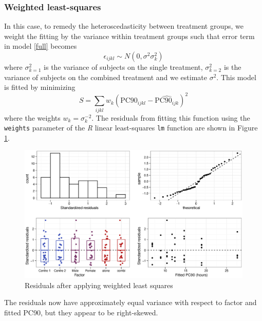 \subsubsection*{Weighted least-squares}
In this case, to remedy the heteroscedasticity between treatment groups, we weight the fitting by the variance within treatment groups such that error term in model \ref{full} becomes 
\begin{equation}
\epsilon_{ijkl}\sim N(0,\sigma^2\sigma_{k}^{2})\label{wls}
\end{equation}
where $\sigma_{k=1}^{2}$ is the variance of subjects on the single treatment, $\sigma_{k=2}^{2}$ is the variance of subjects on the combined treatment and we estimate $\sigma^{2}$. This model is fitted by minimizing
\begin{equation*}
S=\sum_{ijkl} w_{k}(\mathrm{PC}90_{ijkl} - \widehat{\mathrm{PC}90_{ijk}})^{2}
\end{equation*}
where the weights $w_{k}=\sigma_{k}^{-2}$. The residuals from fitting this function using the \texttt{weights} parameter of the \emph{R} linear least-squares \texttt{lm} function are shown in Figure \ref{aovresw}.
\begin{figure}[p]
\includegraphics[width=150mm]{aovresw.eps} 
\caption{Residuals after applying weighted least squares}
\label{aovresw}
\end{figure}
The residuals now have approximately equal variance with respect to factor and fitted PC90, but they appear to be right-skewed.

